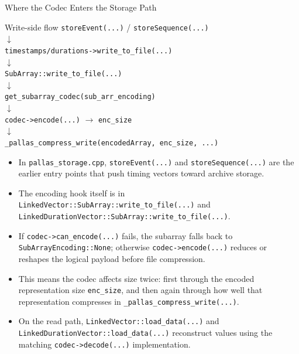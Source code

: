 \documentclass[10pt,aspectratio=169]{beamer}
\begin{document}
\begin{frame}{Where the Codec Enters the Storage Path}
  \small
  \begin{block}{Write-side flow}
    \centering
    \texttt{storeEvent(...)} / \texttt{storeSequence(...)} \\
    $\downarrow$ \\
    \texttt{timestamps/durations->write\_to\_file(...)} \\
    $\downarrow$ \\
    \texttt{SubArray::write\_to\_file(...)} \\
    $\downarrow$ \\
    \texttt{get\_subarray\_codec(sub\_arr\_encoding)} \\
    $\downarrow$ \\
    \texttt{codec->encode(...)} $\rightarrow$ \texttt{enc\_size} \\
    $\downarrow$ \\
    \texttt{\_pallas\_compress\_write(encodedArray, enc\_size, ...)}
  \end{block}

  \begin{itemize}
    \item<2-> In \texttt{pallas\_storage.cpp}, \texttt{storeEvent(...)} and \texttt{storeSequence(...)} are the earlier entry points that push timing vectors toward archive storage.
    \item<3-> The encoding hook itself is in \texttt{LinkedVector::SubArray::write\_to\_file(...)} and \texttt{LinkedDurationVector::SubArray::write\_to\_file(...)}.
    \item<4-> If \texttt{codec->can\_encode(...)} fails, the subarray falls back to \texttt{SubArrayEncoding::None}; otherwise \texttt{codec->encode(...)} reduces or reshapes the logical payload before file compression.
    \item<5-> This means the codec affects size twice: first through the encoded representation size \texttt{enc\_size}, and then again through how well that representation compresses in \texttt{\_pallas\_compress\_write(...)}.
    \item<6-> On the read path, \texttt{LinkedVector::load\_data(...)} and \texttt{LinkedDurationVector::load\_data(...)} reconstruct values using the matching \texttt{codec->decode(...)} implementation.
  \end{itemize}
\end{frame}
\end{document}
